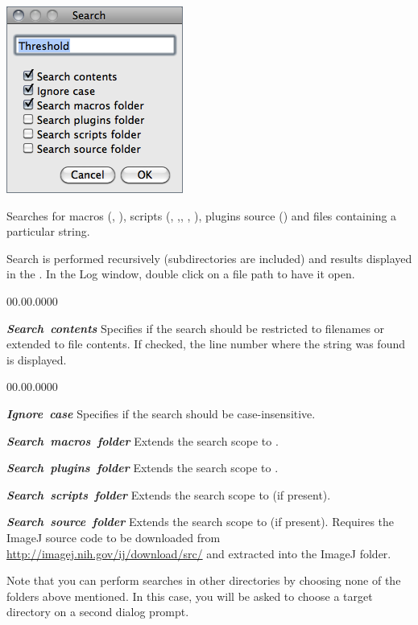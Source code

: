 \begin{minipage}[c][1\totalheight][t]{0.323\columnwidth}%
\includegraphics[scale=0.55]{images/Search}%
\end{minipage}%
\begin{minipage}[c][1\totalheight][t]{0.66\columnwidth}%
Searches for macros (, ), scripts
(, ,, ,
), plugins source () and 
files containing a particular string. \medskip{}


Search is performed recursively (subdirectories are included) and
results displayed in the {\small {}}. In the
Log window, double click on a file path to have it open.
\begin{lyxlist}{00.00.0000}
\item [{\textbf{\emph{Search\ contents}}}] Specifies if the search should
be restricted to filenames or extended to file contents. If checked,
the line number where the string was found is displayed.\end{lyxlist}
%
\end{minipage}
\begin{lyxlist}{00.00.0000}
\item [{\textbf{\emph{Ignore\ case}}}] Specifies if the search should
be case-insensitive.
\item [{\textbf{\emph{Search\ macros\ folder}}}] Extends the search scope
to . 
\item [{\textbf{\emph{Search\ plugins\ folder}}}] Extends the search
scope to . 
\item [{\textbf{\emph{Search\ scripts\ folder}}}] Extends the search
scope to  (if present). 
\item [{\textbf{\emph{Search\ source\ folder}}}] Extends the search scope
to (if present). Requires the ImageJ
source code to be downloaded from \url{http://imagej.nih.gov/ij/download/src/}
and extracted into the ImageJ folder.
\end{lyxlist}
Note that you can perform searches in other directories by choosing
none of the folders above mentioned. In this case, you will be asked
to choose a target directory on a second dialog prompt.


